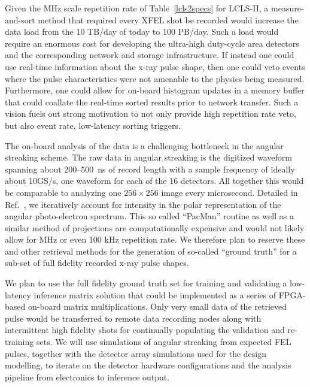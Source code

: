 Given the MHz scale repetition rate of Table~\ref{lcls2specs} for LCLS-II, a measure-and-sort method that required every XFEL shot be recorded would increase the data load from the 10 TB/day of today to 100 PB/day.
Such a load would require an enormous cost for developing the ultra-high duty-cycle area detectors and the corresponding network and storage infrastructure. 
If instead one could use real-time information about the x-ray pulse shape, then one could veto events where the pulse characteristics were not amenable to the physics being measured.
Furthermore, one could allow for on-board histogram updates in a memory buffer that could coallate the real-time sorted results prior to network transfer.
Such a vision fuels out strong motivation to not only provide high repetition rate veto, but also event rate, low-latency sorting triggers.

The on-board analysis of the data is a challenging bottleneck in the angular streaking scheme.
The raw data in angular streaking is the digitized waveform spanning about 200--500~ns of record length with a sample frequency of ideally about 10GS/s, one waveform for each of the 16 detectors.
All together this would be comparable to analyzing one $256\times256$ image every microsecond.
Detailed in Ref.~\cite{Nick2018}, we iteratively account for intensity in the polar representation of the angular photo-electron spectrum.
This so called ``PacMan'' routine as well as a similar method of projections \cite{Siqi2018} are computationally expensive and would not likely allow for MHz or even 100 kHz repetition rate.
We therefore plan to reserve these and other retrieval methods \cite{Thomas2015,HJWorner2018} for the generation of so-called ``ground truth'' for a sub-set of full fidelity recorded x-ray pulse shapes.

We plan to use the full fidelity ground truth set for training and validating a low-latency inference matrix solution that could be implemented as a series of FPGA-based on-board matrix multiplications.
Only very small data of the retrieved pulse would be transferred to remote data recording nodes along with intermittent high fidelity shots for continually populating the validation and re-training sets.
We will use simulations of angular streaking from expected FEL pulses, together with the detector array simulations used for the design modelling, to iterate on the detector hardware configurations and the analysis pipeline from electronics to inference output.

